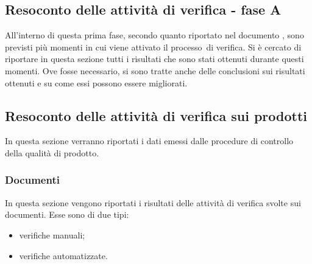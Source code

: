 \documentclass[../PianoDiQualifica.tex]{subfiles}
\begin{document}
\begin{appendices}
\section{Resoconto delle attività di verifica - fase A}
All'interno di questa prima fase\g, secondo quanto riportato nel documento \pianodiprogetto, sono previsti più momenti in cui viene attivato il processo\g\ di verifica. Si è cercato di riportare in questa sezione tutti i risultati che sono stati ottenuti durante questi momenti. Ove fosse necessario, si sono tratte anche delle conclusioni sui risultati ottenuti e su come essi possono essere migliorati.
	\subsection{Resoconto delle attività di verifica sui prodotti}
	In questa sezione verranno riportati i dati emessi dalle procedure di controllo della qualità di prodotto\g.
		\subsubsection{Documenti}
		In questa sezione vengono riportati i risultati delle attività di verifica svolte sui documenti. Esse sono di due tipi:
		\begin{itemize}
			\item verifiche manuali;
			\item verifiche automatizzate.
		\end{itemize}

\end{appendices}
\end{document}
